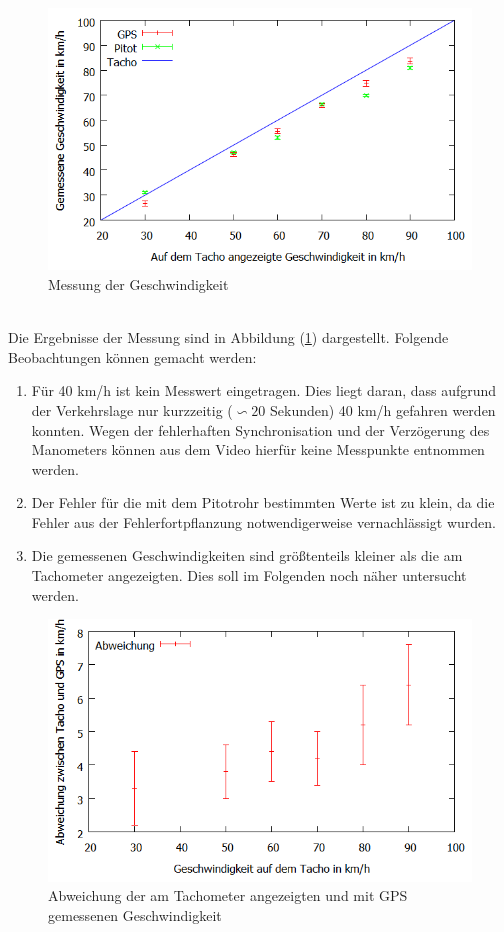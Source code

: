 \begin{figure}
      \includegraphics[width=.9\textwidth]{images/Geschwindigkeit}
\caption{Messung der Geschwindigkeit}
\label{fig:Geschwindigkeit}
\end{figure}
\\
Die Ergebnisse der Messung sind in Abbildung (\ref{fig:Geschwindigkeit}) dargestellt. Folgende Beobachtungen können gemacht werden:
\begin{enumerate}
\item Für 40 km/h ist kein Messwert eingetragen. Dies liegt daran, dass aufgrund der Verkehrslage nur kurzzeitig ($\backsim 20$ Sekunden) 40 km/h gefahren werden konnten. Wegen der fehlerhaften Synchronisation und der Verzögerung des Manometers können aus dem Video hierfür keine Messpunkte entnommen werden.
\item Der Fehler für die mit dem Pitotrohr bestimmten Werte ist zu klein, da die Fehler aus der Fehlerfortpflanzung notwendigerweise vernachlässigt wurden.
\item Die gemessenen Geschwindigkeiten sind größtenteils kleiner als die am Tachometer angezeigten. Dies soll im Folgenden noch näher untersucht werden.
\end{enumerate}
\begin{figure}
      \includegraphics[width=.9\textwidth]{images/AbweichungGPSTacho}
\caption{Abweichung der am Tachometer angezeigten und mit GPS gemessenen Geschwindigkeit}
\label{fig:AbweichungGPSTacho}
\end{figure}
